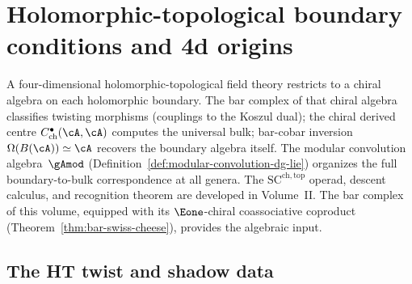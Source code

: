 \chapter{Holomorphic-topological boundary conditions and 4d origins}
\label{v1-ch:ht-boundary}


\label{conj:agt-bar-cobar}%
\label{conj:nc-cs}%
\label{conj:q-agt}%
\label{def:w-algebra-cft}%
\label{thm:genus-graded-bar}%

A four-dimensional holomorphic-topological field theory restricts to a
chiral algebra on each holomorphic boundary. The bar complex of that
chiral algebra classifies twisting morphisms (couplings to the
Koszul dual); the chiral derived centre
$C^\bullet_{\mathrm{ch}}(\cA,\cA)$ computes the universal
bulk; bar-cobar inversion $\Omega(B(\cA)) \simeq \cA$
recovers the boundary algebra itself. The modular
convolution algebra~$\gAmod$
(Definition~\ref{def:modular-convolution-dg-lie}) organizes the full boundary-to-bulk correspondence
at all genera. The $\mathrm{SC}^{\mathrm{ch,top}}$ operad, descent
calculus, and recognition theorem are developed in Volume~II\@. The bar complex of
this volume, equipped with its $\Eone$-chiral coassociative coproduct
(Theorem~\ref{thm:bar-swiss-cheese}), provides the algebraic input.

\section{The HT twist and shadow data}
\label{sec:ht-shadow-data}

